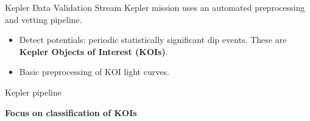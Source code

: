 \documentclass{beamer}
\begin{document}
\begin{frame}{Kepler Data Validation Stream}
	Kepler mission uses an automated preprocessing and vetting pipeline.
\begin{itemize}
	\item Detect potentials: periodic statistically significant dip events. These are \textbf{Kepler Objects of Interest (KOIs)}.
	\item Basic preprocessing of KOI light curves.
\end{itemize} 
\begin{block}{Kepler pipeline}
\begin{adjustbox}{max totalsize={.9\textwidth}{.7\textheight},center}
	
		
\end{adjustbox}
\end{block}
\textbf{Focus on classification of KOIs}
\end{frame}	
	
\end{document}
